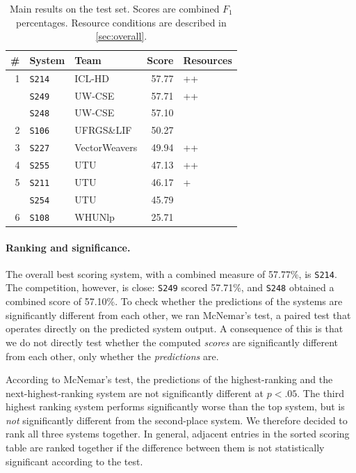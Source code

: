 \documentclass[11pt,letterpaper]{article}
\newcommand{\sys}[1]{\mbox{\texttt{#1}}}   %
\begin{document}
\begin{table}\small\centering
\begin{tabular}{rllrl}
 \#   & \textbf{System} &           \textbf{Team} &  \textbf{Score}  & \textbf{Resources} \\
\midrule
    1 &   \sys{S214} &         ICL-HD &  57.77 &   ++ \\
      &   \sys{S249} &         UW-CSE &  57.71 &   ++ \\
      &   \sys{S248} &         UW-CSE &  57.10 &      \\
    2 &   \sys{S106} &     UFRGS\&LIF &  50.27 &      \\
    3 &   \sys{S227} &  VectorWeavers &  49.94 &   ++ \\
    4 &   \sys{S255} &            UTU &  47.13 &   ++ \\
    5 &   \sys{S211} &            UTU &  46.17 &    + \\
      &   \sys{S254} &            UTU &  45.79 &      \\
    6 &   \sys{S108} &         WHUNlp &  25.71 &      \\
\end{tabular}

\caption{Main results on the test set. Scores are combined $F_1$ percentages. 
Resource conditions are described in \cref{sec:overall}.}

\label{tbl:main-results}
	
\end{table}


\paragraph{Ranking and significance.}
The overall best scoring system, with a combined measure of 57.77\%, is \sys{S214}. 
The competition, however, is close: \sys{S249} scored 57.71\%, and \sys{S248} obtained a combined score of 57.10\%.  
To check whether the predictions of the systems are significantly different from each other, 
we ran McNemar's test, a paired test that operates directly on the predicted system output. 
A consequence of this is that we do not directly test whether the computed \emph{scores} 
are significantly different from each other, only whether the \emph{predictions} are. 

According to McNemar's test, the predictions of the highest-ranking and the next-highest-ranking system 
are not significantly different at $p < .05$. The third highest ranking system performs significantly worse 
than the top system, but is \emph{not} significantly different from the second-place system. 
We therefore decided to rank all three systems together. 
In general, adjacent entries in the sorted scoring table are ranked together 
if the difference between them is not statistically significant according to the test. 
\end{document}
